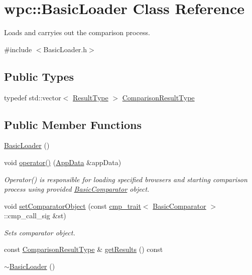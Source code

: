 \hypertarget{classwpc_1_1_basic_loader}{\section{wpc\-:\-:Basic\-Loader Class Reference}
\label{classwpc_1_1_basic_loader}
}


Loads and carryies out the comparison process.  




{\ttfamily \#include $<$Basic\-Loader.\-h$>$}

\subsection*{Public Types}
\begin{DoxyCompactItemize}
\item 
typedef std\-::vector$<$ \hyperlink{structwpc_1_1_result_type}{Result\-Type} $>$ \hyperlink{classwpc_1_1_basic_loader_abae37c020f8996c8cd770db2edcb3bea}{Comparison\-Result\-Type}
\end{DoxyCompactItemize}
\subsection*{Public Member Functions}
\begin{DoxyCompactItemize}
\item 
\hyperlink{classwpc_1_1_basic_loader_aad2a76648585da05f702e8b456ed9771}{Basic\-Loader} ()
\item 
void \hyperlink{classwpc_1_1_basic_loader_a05153c89ee24cb38447a04215c58e488}{operator()} (\hyperlink{structwpc_1_1_app_data}{App\-Data} \&app\-Data)
\begin{DoxyCompactList}\small\item\em Operator() is responsible for loading specified browsers and starting comparison process using provided \hyperlink{classwpc_1_1_basic_comparator}{Basic\-Comparator} object. \end{DoxyCompactList}\item 
void \hyperlink{classwpc_1_1_basic_loader_ad99e8b8031a9757179361e24676c4fdc}{set\-Comparator\-Object} (const \hyperlink{structwpc_1_1cmp__trait}{cmp\-\_\-trait}$<$ \hyperlink{classwpc_1_1_basic_comparator}{Basic\-Comparator} $>$\-::cmp\-\_\-call\-\_\-sig \&st)
\begin{DoxyCompactList}\small\item\em Sets comparator object. \end{DoxyCompactList}\item 
const \hyperlink{classwpc_1_1_basic_loader_abae37c020f8996c8cd770db2edcb3bea}{Comparison\-Result\-Type} \& \hyperlink{classwpc_1_1_basic_loader_a95212e768136af62abb7db739dd7cc9b}{get\-Results} () const 
\item 
\hyperlink{classwpc_1_1_basic_loader_a0da11cf2fb72e7706fd878b71dd303f5}{$\sim$\-Basic\-Loader} ()
\end{DoxyCompactItemize}
